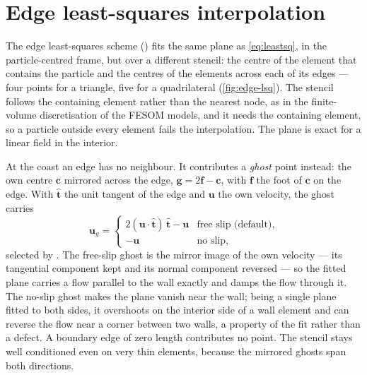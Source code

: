 \section{Edge least-squares interpolation}\label{sec:hvel-edge}

The edge least-squares scheme () fits the same plane as
\cref{eq:leastsq}, in the particle-centred frame, but over a different stencil: the centre of the
element that contains the particle and the centres of the elements across each of its edges --- four
points for a triangle, five for a quadrilateral (\cref{fig:edge-lsq}). The stencil follows the
containing element rather than the nearest node, as in the finite-volume discretisation of the FESOM
models, and it needs the containing element, so a particle outside every element fails the
interpolation. The plane is exact for a linear field in the interior.

At the coast an edge has no neighbour. It contributes a \emph{ghost} point instead: the own centre
$\mathbf{c}$ mirrored across the edge, $\mathbf{g}=2\mathbf{f}-\mathbf{c}$, with $\mathbf{f}$ the foot of
$\mathbf{c}$ on the edge. With $\hat{\mathbf{t}}$ the unit tangent of the edge and $\mathbf{u}$ the own
velocity, the ghost carries
\begin{equation}\label{eq:edge-ghost}
  \mathbf{u}_g =
  \begin{cases}
    2(\mathbf{u}\cdot\hat{\mathbf{t}})\,\hat{\mathbf{t}}-\mathbf{u} & \text{free slip (default)},\\
    -\mathbf{u} & \text{no slip},
  \end{cases}
\end{equation}
selected by . The free-slip ghost is the mirror image of the own velocity ---
its tangential component kept and its normal component reversed --- so the fitted plane carries a
flow parallel to the wall exactly and damps the flow through it. The no-slip ghost makes the plane
vanish near the wall; being a single plane fitted to both sides, it overshoots on the interior side of
a wall element and can reverse the flow near a corner between two walls, a property of the fit rather
than a defect. A boundary edge of zero length contributes no point. The stencil stays well conditioned
even on very thin elements, because the mirrored ghosts span both directions.

